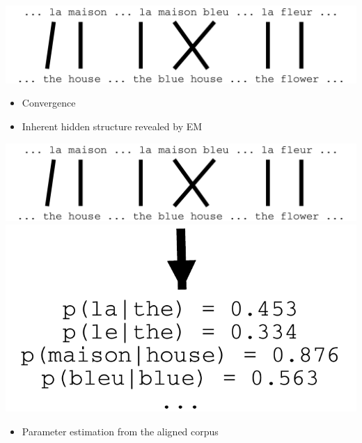 \documentclass[landscape]{slides}
\begin{document}

\vspace{10mm}
\begin{center}
\includegraphics[scale=0.9]{em4.pdf}
\end{center}
\begin{itemize}
\item Convergence
\item Inherent hidden structure revealed by EM
\end{itemize}



\vspace{5mm}
\begin{center}
\includegraphics[scale=0.9]{em4.pdf}
\includegraphics[scale=0.9]{em-result.pdf}
\end{center}
\begin{itemize}
\item Parameter estimation from the aligned corpus
\end{itemize}
\end{document}
